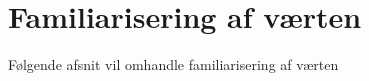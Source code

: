 \section{Familiarisering af værten}
\label{FamiliariseringSocialAccept}
% 
Følgende afsnit vil omhandle familiarisering af værten  

